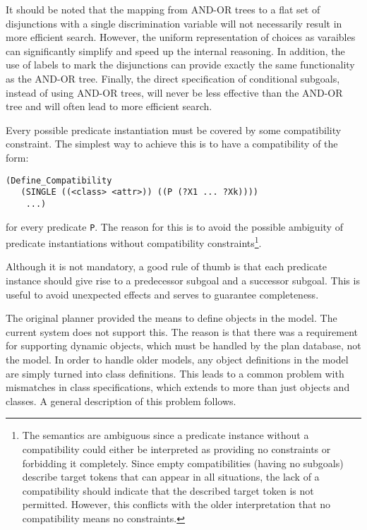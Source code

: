 It should be noted that the mapping from AND-OR trees to a flat set of
disjunctions with a single discrimination variable will not necessarily
result in more efficient search.  However, the uniform representation
of choices as varaibles can significantly simplify and speed up the
internal reasoning.  In addition, the use of labels to mark the
disjunctions can provide exactly the same functionality as the AND-OR
tree.  Finally, the direct specification of conditional subgoals,
instead of using AND-OR trees, will never be less effective than the
AND-OR tree and will often lead to more efficient search.




Every possible predicate instantiation must be covered by some
compatibility constraint.  The simplest way to achieve this is to 
have a compatibility of the form:
\begin{verbatim}
(Define_Compatibility
   (SINGLE ((<class> <attr>)) ((P (?X1 ... ?Xk))))
    ...)
\end{verbatim}
for every predicate {\tt P}.  The reason for this is to avoid the
possible ambiguity of predicate instantiations without compatibility
constraints\footnote{The semantics are ambiguous since a predicate
instance without a compatibility could either be interpreted as
providing no constraints or forbidding it completely.  Since empty
compatibilities (having no subgoals) describe target tokens that can 
appear in all situations, the lack of a compatibility should indicate 
that the described target token is not permitted.  However, this 
conflicts with the older interpretation that no compatibility means 
no constraints.}.

Although it is not mandatory, a good rule of thumb is that each
predicate instance should give rise to a predecessor subgoal and a
successor subgoal.  This is useful to avoid unexpected effects and
serves to guarantee completeness.

The original planner provided the means to define objects in the
model.  The current system does not support this.  The reason is that
there was a requirement for supporting dynamic objects, which must be
handled by the plan database, not the model.  In order to handle older
models, any object definitions in the model are simply turned into
class definitions.  This leads to a common problem with mismatches in
class specifications, which extends to more than just objects and
classes.  A general description of this problem follows.

